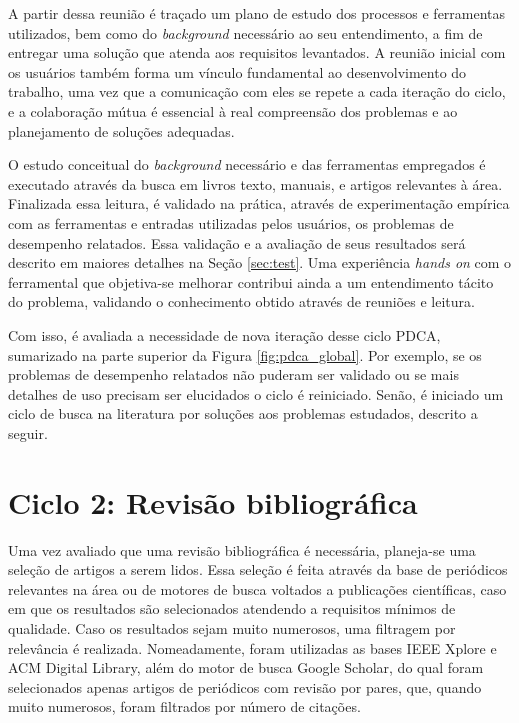 \documentclass[cic,tc]{iiufrgs}
\begin{document}
A partir dessa reunião é traçado um plano de estudo dos processos e ferramentas
utilizados, bem como do \textit{background} necessário ao seu entendimento, a
fim de entregar uma solução que atenda aos requisitos levantados. A reunião
inicial com os usuários também forma um vínculo fundamental ao desenvolvimento
do trabalho, uma vez que a comunicação com eles se repete a cada iteração do
ciclo, e a colaboração mútua é essencial à real compreensão dos problemas e ao
planejamento de soluções adequadas.

O estudo conceitual do \textit{background} necessário e das ferramentas
empregados é executado através da busca em livros texto, manuais, e artigos
relevantes à área. Finalizada essa leitura, é validado na prática, através de
experimentação empírica com as ferramentas e entradas utilizadas pelos
usuários, os problemas de desempenho relatados. Essa validação e a avaliação de
seus resultados será descrito em maiores detalhes na Seção \ref{sec:test}. Uma
experiência \textit{hands on} com o ferramental que objetiva-se melhorar
contribui ainda a um entendimento tácito do problema, validando o conhecimento
obtido através de reuniões e leitura. 

Com isso, é avaliada a necessidade de nova iteração desse ciclo PDCA,
sumarizado na parte superior da Figura \ref{fig:pdca_global}. Por exemplo, se
os problemas de desempenho relatados não puderam ser validado ou se mais
detalhes de uso precisam ser elucidados o ciclo é reiniciado. Senão, é iniciado
um ciclo de busca na literatura por soluções aos problemas estudados, descrito
a seguir.

\section{Ciclo 2: Revisão bibliográfica}
\label{sec:lit}

Uma vez avaliado que uma revisão bibliográfica é necessária, planeja-se uma
seleção de artigos a serem lidos. Essa seleção é feita através da base de
periódicos relevantes na área ou de motores de busca voltados a publicações
científicas, caso em que os resultados são selecionados atendendo a requisitos
mínimos de qualidade. Caso os resultados sejam muito numerosos, uma filtragem
por relevância é realizada. Nomeadamente, foram utilizadas as bases IEEE Xplore
e ACM Digital Library, além do motor de busca Google Scholar, do qual foram
selecionados apenas artigos de periódicos com revisão por pares, que, quando
muito numerosos, foram filtrados por número de citações.
\end{document}
